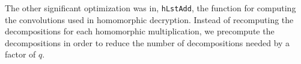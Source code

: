 \documentclass{article}
\begin{document}
The other significant optimization was in, \texttt{hLstAdd}, the function for computing the convolutions used in homomorphic decryption. Instead of recomputing the decompositions for each homomorphic multiplication, we precompute the decompositions in order to reduce the number of decompositions needed by a factor of $q$.
\end{document}
